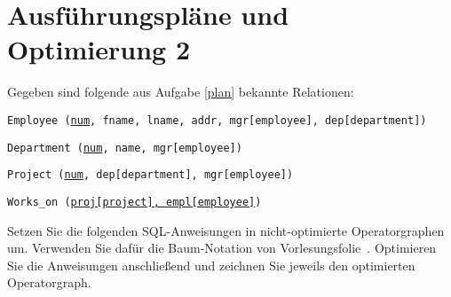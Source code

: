 \section{Ausführungspläne und Optimierung 2}

Gegeben sind folgende aus Aufgabe \ref{plan} bekannte Relationen:

\texttt{Employee (\underline{num}, fname, lname, addr, mgr[employee], dep[department])}

\texttt{Department (\underline{num}, name, mgr[employee])}

\texttt{Project (\underline{num}, dep[department], mgr[employee])}

\texttt{Works\_on (\underline{proj[project], empl[employee]})}

Setzen Sie die folgenden SQL-Anweisungen in nicht-optimierte Operatorgraphen um.
Verwenden Sie dafür die Baum-Notation von Vorlesungsfolie~\Operatorgraph.
Optimieren Sie die Anweisungen anschließend und zeichnen Sie jeweils den optimierten Operatorgraph.

